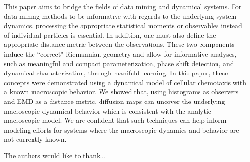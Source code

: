 \documentclass[prl, reprint]{revtex4-1}
\begin{document}
This paper aims to bridge the fields of data mining and dynamical systems. 
%
For data mining methods to be informative with regards to the underlying system dynamics, processing the appropriate statistical moments or observables instead of individual particles is essential. 
%
In addition, one must also define the appropriate distance metric between the observations.
%
These two components induce the ``correct" Riemannian geometry and allow for informative analyses, such as meaningful and compact parameterization, phase shift detection, and dynamical characterization, through manifold learning.
%
In this paper, these concepts were demonstrated using a dynamical model of cellular chemotaxis with a known macroscopic behavior.
%
We showed that, using histograms as observers and EMD as a distance metric, diffusion maps can uncover the underlying macroscopic dynamical behavior which is consistent with the analytic macroscopic model.
%
We are confident that such techniques can help inform modeling efforts for systems where the macroscopic dynamics and behavior are not currently known. 




\begin{acknowledgments}

The authors would like to thank...

\end{acknowledgments}




\end{document}
